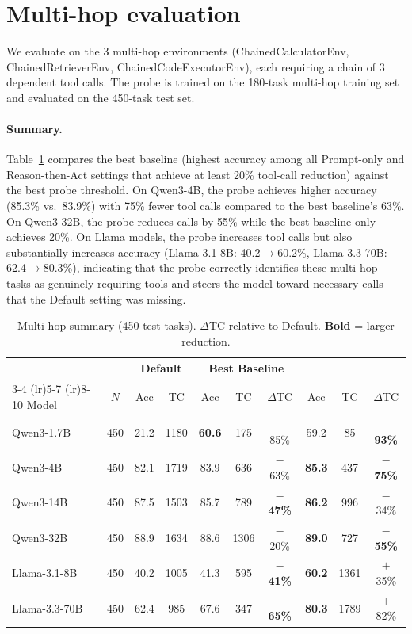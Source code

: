 \newpage
\section{Multi-hop evaluation}
\label{app:multihop}

We evaluate \method{} on the 3 multi-hop environments (ChainedCalculatorEnv, ChainedRetrieverEnv, ChainedCodeExecutorEnv), each requiring a chain of 3 dependent tool calls. The probe is trained on the 180-task multi-hop training set and evaluated on the 450-task test set.

\paragraph{Summary.}
Table~\ref{tab:multihop_summary} compares the best baseline (highest accuracy among all Prompt-only and Reason-then-Act settings that achieve at least 20\% tool-call reduction) against the best probe threshold. On Qwen3-4B, the probe achieves higher accuracy (85.3\% vs.\ 83.9\%) with 75\% fewer tool calls compared to the best baseline's 63\%. On Qwen3-32B, the probe reduces calls by 55\% while the best baseline only achieves 20\%. On Llama models, the probe increases tool calls but also substantially increases accuracy (Llama-3.1-8B: 40.2$\to$60.2\%, Llama-3.3-70B: 62.4$\to$80.3\%), indicating that the probe correctly identifies these multi-hop tasks as genuinely requiring tools and steers the model toward necessary calls that the Default setting was missing.

\begin{table}[H]
\caption{Multi-hop summary (450 test tasks). $\Delta$TC relative to Default. \textbf{Bold} = larger reduction.}
\label{tab:multihop_summary}
\centering
\small
\setlength{\tabcolsep}{3pt}
\begin{tabular}{l c cc ccc ccc}
\toprule
& & \multicolumn{2}{c}{Default} & \multicolumn{3}{c}{Best Baseline} & \multicolumn{3}{c}{\method{}} \\
\cmidrule(lr){3-4} \cmidrule(lr){5-7} \cmidrule(lr){8-10}
Model & $N$ & Acc & TC & Acc & TC & $\Delta$TC & Acc & TC & $\Delta$TC \\
\midrule
Qwen3-1.7B   & 450 & 21.2 & 1180 & \textbf{60.6} & 175 & $-$85\% & 59.2 & 85 & \textbf{$-$93\%} \\
Qwen3-4B     & 450 & 82.1 & 1719 & 83.9 & 636 & $-$63\% & \textbf{85.3} & 437 & \textbf{$-$75\%} \\
Qwen3-14B    & 450 & 87.5 & 1503 & 85.7 & 789 & \textbf{$-$47\%} & \textbf{86.2} & 996 & $-$34\% \\
Qwen3-32B    & 450 & 88.9 & 1634 & 88.6 & 1306 & $-$20\% & \textbf{89.0} & 727 & \textbf{$-$55\%} \\
Llama-3.1-8B & 450 & 40.2 & 1005 & 41.3 & 595 & \textbf{$-$41\%} & \textbf{60.2} & 1361 & $+$35\% \\
Llama-3.3-70B& 450 & 62.4 & 985 & 67.6 & 347 & \textbf{$-$65\%} & \textbf{80.3} & 1789 & $+$82\% \\
\bottomrule
\end{tabular}
\end{table}

